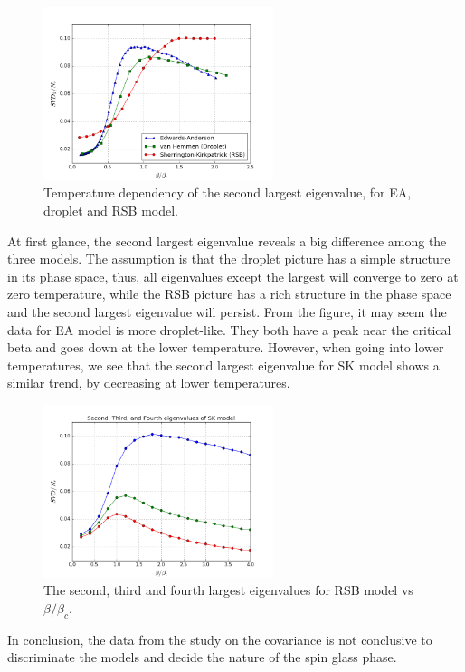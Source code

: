 \begin{figure}[ht]
  \centering
  \includegraphics[width=0.6\textwidth]{img/matrix/svd1_vs_beta.png}
  \caption{Temperature dependency of the second largest eigenvalue, for EA, droplet and RSB model.}
  \label{fig:eig1}
\end{figure}

At first glance, the second largest eigenvalue reveals a big difference among 
the three models. The assumption is that the droplet picture has a simple 
structure in its phase space, thus, all eigenvalues except the largest will 
converge to zero at zero temperature, while the RSB picture has a rich structure 
in the phase space and the second largest eigenvalue will persist. 
From the figure, it may seem the data for EA model is more droplet-like. They both 
have a peak near the critical beta and goes down at the lower temperature.
However, when going into lower temperatures, we see that the second largest 
eigenvalue for SK model shows a similar trend, by decreasing at lower temperatures.

\begin{figure}[ht]
  \centering
  \includegraphics[width=0.6\textwidth]{img/matrix/eigenvalues_rsb.png}
  \caption{The second, third and fourth largest eigenvalues for RSB model vs
$\beta/\beta_c$.}
  \label{fig:eigRSB2}
\end{figure}


In conclusion, the data from the study on the covariance is not conclusive to 
discriminate the models and decide the nature of the spin glass phase.

